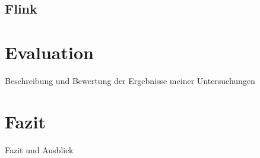 \section{Flink}

\chapter{Evaluation}
Beschreibung und Bewertung der Ergebnisse meiner Untersuchungen

\chapter{Fazit}
Fazit und Ausblick

